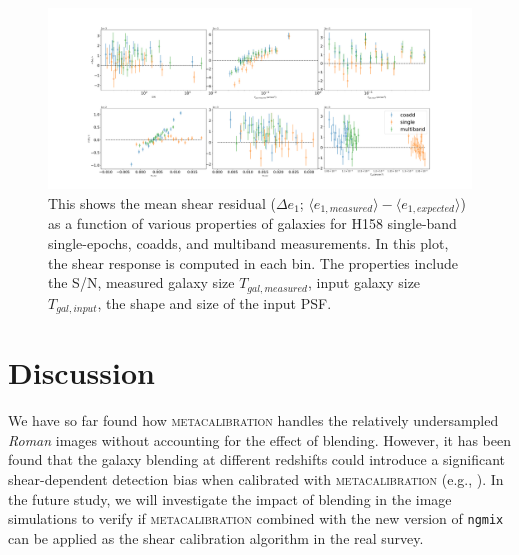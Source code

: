 \documentclass[fleqn,usenatbib]{mnras}
\begin{document}
\begin{figure}
    \hspace*{-3.5cm}
    \centering
	\includegraphics[scale=0.34]{H158_meanshear_measured_properties_perbin_e1_v2.pdf}
    \caption{This shows the mean shear residual ($\Delta e_{1}$; $\langle e_{1,measured} \rangle - \langle e_{1,expected} \rangle$) as a function of various properties of galaxies for H158 single-band single-epochs, coadds, and multiband measurements. In this plot, the shear response is computed in each bin. The properties include the S/N, measured galaxy size $T_{gal,measured}$, input galaxy size $T_{gal,input}$, the shape and size of the input PSF.}
    \label{fig:meanshear}
\end{figure}


\section{Discussion}
\label{sec:discussion}

We have so far found how \textsc{metacalibration} handles the relatively undersampled \emph{Roman} images without accounting for the effect of blending. However, it has been found that the galaxy blending at different redshifts could introduce a significant shear-dependent detection bias when calibrated with \textsc{metacalibration} (e.g., \citealt{2020ApJ...902..138S}). In the future study, we will investigate the impact of blending in the image simulations to verify if \textsc{metacalibration} combined with the new version of \texttt{ngmix} can be applied as the shear calibration algorithm in the real survey. 
\end{document}
